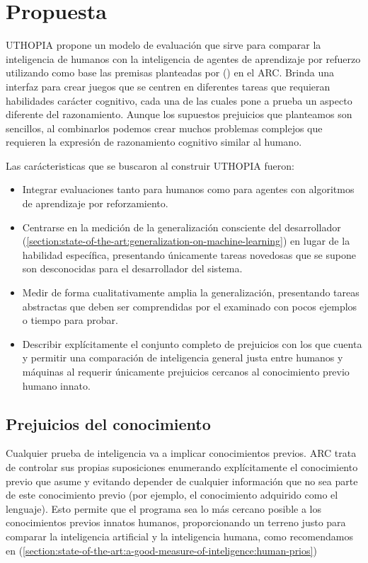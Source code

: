 \chapter{Propuesta}\label{chapter:proposal}

UTHOPIA propone un modelo de evaluación que sirve para comparar la inteligencia de humanos con la inteligencia de agentes de aprendizaje por refuerzo utilizando como base las premisas planteadas por (\cite{chollet2019measure}) en el ARC. Brinda una interfaz para crear juegos que se centren en diferentes tareas que requieran habilidades carácter cognitivo, cada una de las cuales pone a prueba un aspecto diferente del razonamiento. Aunque los supuestos prejuicios que planteamos son sencillos, al combinarlos podemos crear muchos problemas complejos que requieren la expresión de razonamiento cognitivo similar al humano.

Las carácteristicas que se buscaron al construir UTHOPIA fueron:

\begin{itemize}
    \item Integrar evaluaciones tanto para humanos como para agentes con algoritmos de aprendizaje por reforzamiento.
    \item Centrarse en la medición de la generalización consciente del desarrollador (\ref{section:state-of-the-art:generalization-on-machine-learning}) en lugar de la habilidad específica, presentando únicamente tareas novedosas que se supone son desconocidas para el desarrollador del sistema.
    \item Medir de forma cualitativamente amplia la generalización, presentando tareas abstractas que deben ser comprendidas por el examinado con pocos ejemplos o tiempo para probar.
    \item Describir explícitamente el conjunto completo de prejuicios con los que cuenta y permitir una comparación de inteligencia general justa entre humanos y máquinas al requerir únicamente prejuicios cercanos al conocimiento previo humano innato.
\end{itemize}

\section{Prejuicios del conocimiento} 

Cualquier prueba de inteligencia va a implicar conocimientos previos. ARC trata de controlar sus propias suposiciones enumerando explícitamente el conocimiento previo que asume y evitando depender de cualquier información que no sea parte de este conocimiento previo (por ejemplo, el conocimiento adquirido como el lenguaje). Esto permite que el programa sea lo más cercano posible a los conocimientos previos innatos humanos, proporcionando un terreno justo para comparar la inteligencia artificial y la inteligencia humana, como recomendamos en (\ref{section:state-of-the-art:a-good-measure-of-inteligence:human-prios})

